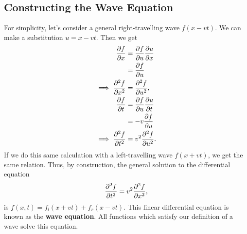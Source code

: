 \documentclass[../classical_mechanics.tex]{subfiles}
\begin{document}
        \subsection{Constructing the Wave Equation}\label{subsec:constructing-the-wave-equation}
            For simplicity, let's consider a general right-travelling wave $f(x-vt)$. We can make a substitution $u=x-vt$.
            Then we get
            \begin{align}
                \pdv{f}{x}&=\pdv{f}{u}\pdv{u}{x}\\
                &=\pdv{f}{u}\\
                \implies\pdv[2]{f}{x}&=\pdv[2]{f}{u},\\
                \pdv{f}{t}&=\pdv{f}{u}\pdv{u}{t}\\
                &=-v\pdv{f}{u}\\
                \implies\pdv[2]{f}{t}&=v^2\pdv[2]{f}{u}.
            \end{align}
            If we do this same calculation with a left-travelling wave $f(x+vt)$, we get the same relation.
            Thus, by construction, the general solution to the differential equation
            \begin{equation}
                \pdv[2]{f}{t}=v^2\pdv[2]{f}{x},
            \end{equation}
            is $f(x,t)=f_l(x+vt)+f_r(x-vt)$.
            This linear differential equation is known as the \textbf{wave equation}.
            All functions which satisfy our definition of a wave solve this equation.
\end{document}
